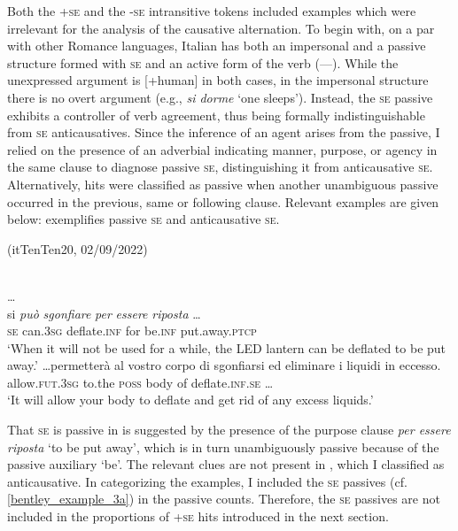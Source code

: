 \documentclass[output=paper,colorlinks,citecolor=brown
]{langscibook}
\begin{document}
Both the +\textsc{se} and the -\textsc{se} intransitive tokens included examples which were irrelevant for the analysis of the causative alternation. To begin with, on a par with other Romance languages, Italian has both an impersonal and a passive structure formed with \textsc{se} and an active form of the verb (—). While the unexpressed argument is [+human] in both cases, in the impersonal structure there is no overt argument (e.g., \textit{si dorme} ‘one sleeps’). Instead, the \textsc{se} passive exhibits a controller of verb agreement, thus being formally indistinguishable from \textsc{se} anticausatives. Since the inference of an agent arises from the passive, I relied on the presence of an adverbial indicating manner, purpose, or agency in the same clause to diagnose passive \textsc{se}, distinguishing it from anticausative \textsc{se}. Alternatively, hits were classified as passive when another unambiguous passive occurred in the previous, same or following clause. Relevant examples are given below:  exemplifies passive \textsc{se} and  anticausative \textsc{se}.

\hspace*{\fill}(itTenTen20, 02/09/2022)\quad

\ea \label{bentley_example_3}
    \ea \label{bentley_example_3a}
     \\
    {}\ldots\\
    \gll si \textit{può} \textit{sgonfiare} \textit{per} \textit{essere} \textit{riposta} \ldots  \\
    \textsc{se} can.3\textsc{sg} deflate.\textsc{inf} for be.\textsc{inf} put.away.\textsc{ptcp} \\
    \glt ‘When it will not be used for a while, the LED lantern can be deflated to be put away.’
    \ex \label{bentley_example_3b}
    \gll  \ldots  permetterà al vostro corpo di sgonfiarsi {ed eliminare i liquidi in eccesso.} \\
    allow.\textsc{fut}.3\textsc{sg} to.the \textsc{poss} body of deflate.\textsc{inf}.\textsc{se} {\ldots} \\
    \glt ‘It will allow your body to deflate and get rid of any excess liquids.’
    \z
\z

That \textsc{se} is passive in  is suggested by the presence of the purpose clause \textit{per essere riposta} ‘to be put away’, which is in turn unambiguously passive because of the passive auxiliary ‘be’. The relevant clues are not present in , which I classified as anticausative. In categorizing the examples, I included the \textsc{se} passives (cf. \ref{bentley_example_3a}) in the passive counts. Therefore, the \textsc{se} passives are not included in the proportions of +\textsc{se} hits introduced in the next section. 
\end{document}
